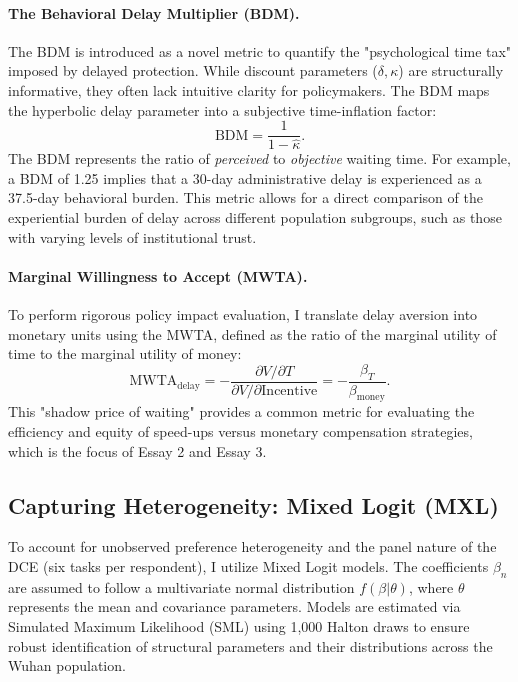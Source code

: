 \documentclass[doublespacing]{utdthesis}
\begin{document}
\paragraph{The Behavioral Delay Multiplier (BDM).} 
The BDM is introduced as a novel metric to quantify the "psychological time tax" imposed by delayed protection. While discount parameters ($\delta, \kappa$) are structurally informative, they often lack intuitive clarity for policymakers. The BDM maps the hyperbolic delay parameter into a subjective time-inflation factor:
\begin{equation}
\text{BDM} = \frac{1}{1-\hat{\kappa}}.
\label{eq:bdm_def_backbone}
\end{equation}
The BDM represents the ratio of \textit{perceived} to \textit{objective} waiting time. For example, a BDM of 1.25 implies that a 30-day administrative delay is experienced as a 37.5-day behavioral burden. This metric allows for a direct comparison of the experiential burden of delay across different population subgroups, such as those with varying levels of institutional trust.

\paragraph{Marginal Willingness to Accept (MWTA).} 
To perform rigorous policy impact evaluation, I translate delay aversion into monetary units using the MWTA, defined as the ratio of the marginal utility of time to the marginal utility of money:
\begin{equation}
\text{MWTA}_{\text{delay}} = - \frac{\partial V / \partial T}{\partial V / \partial \text{Incentive}} = - \frac{\beta_{T}}{\beta_{\text{money}}}.
\label{eq:mwta_def_backbone}
\end{equation}
This "shadow price of waiting" provides a common metric for evaluating the efficiency and equity of speed-ups versus monetary compensation strategies, which is the focus of Essay 2 and Essay 3.

\subsection{Capturing Heterogeneity: Mixed Logit (MXL)}
To account for unobserved preference heterogeneity and the panel nature of the DCE (six tasks per respondent), I utilize Mixed Logit models. The coefficients $\beta_n$ are assumed to follow a multivariate normal distribution $f(\beta|\theta)$, where $\theta$ represents the mean and covariance parameters. Models are estimated via Simulated Maximum Likelihood (SML) using 1,000 Halton draws to ensure robust identification of structural parameters and their distributions across the Wuhan population.
\end{document}
